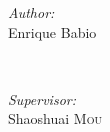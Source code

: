 \begin{titlepage}

\begin{minipage}{0.4\textwidth}
  \begin{flushleft} \large
    \emph{Author:}\\
     Enrique Babio 						%
  \end{flushleft}
\end{minipage}
~
\begin{minipage}{0.4\textwidth}
  \begin{flushright} \large
    \emph{Supervisor:} \\
    Shaoshuai \textsc{Mou} 				%
  \end{flushright}
\end{minipage}\\



\vfill %

\end{titlepage}
